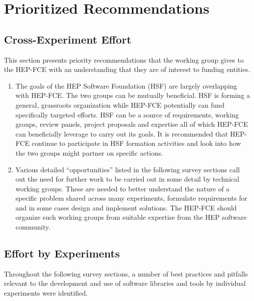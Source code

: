 \section{Prioritized Recommendations}

\subsection{Cross-Experiment Effort}

This section presents priority recommendations that the working group
gives to the HEP-FCE with an understanding that they are of interest
to funding entities.

\begin{enumerate}
\item The goals of the HEP Software Foundation\cite{hsfweb} (HSF) are
  largely overlapping with HEP-FCE.  The two groups can be mutually
  beneficial.  HSF is forming a general, grassroots organization while
  HEP-FCE potentially can fund specifically targeted efforts.  HSF can
  be a source of requirements, working groups, review panels, project
  proposals and expertise all of which HEP-FCE can beneficially
  leverage to carry out its goals.  It is recommended that HEP-FCE
  continue to participate in HSF formation activities and look into
  how the two groups might partner on specific actions.

\item Various detailed ``opportunities'' listed in the following
  survey sections call out the need for further work to be carried out
  in some detail by technical working groups. These are needed to
  better understand the nature of a specific problem shared across
  many experiments, formulate requirements for and in some cases
  design and implement solutions.  The HEP-FCE should organize such
  working groups from suitable expertise from the HEP software community.

\end{enumerate}


\subsection{Effort by Experiments}

Throughout the following survey sections, a number of best practices
and pitfalls relevant to the development and use of software libraries
and tools by individual experiments were identified.

